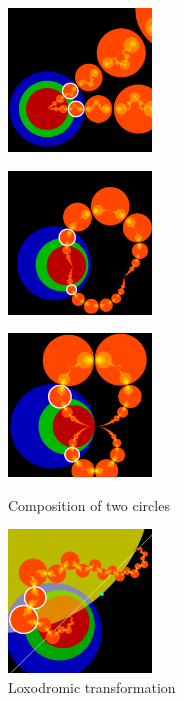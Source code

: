 \begin{figure}[h!tbp]
 \begin{minipage}[]{0.65\hsize}
  \begin{minipage}[]{0.22\hsize}
   \center
   \includegraphics[width=1.5in, height=1.5in, keepaspectratio]{../img/klein/2diis/scalingEdged.pdf}
   \label{fig:scaling2d}
  \end{minipage}
 \hspace*{\fill}
  \begin{minipage}[]{0.22\hsize}
   \center
   \includegraphics[width=1.5in, height=1.5in, keepaspectratio]{../img/klein/2diis/hyperbolicEdged.pdf}
   \label{fig:hyperbolic2d}
  \end{minipage}
 \hspace*{\fill}
  \begin{minipage}[]{0.22\hsize}
   \center
   \includegraphics[width=1.5in, height=1.5in, keepaspectratio]{../img/klein/2diis/parabolicEdged.pdf}
   \label{fig:parabolic2d}
  \end{minipage}
  \caption{Composition of two circles}
 \end{minipage}
 \hspace*{\fill}
 \begin{minipage}[]{0.22\hsize}
  \center
  \includegraphics[width=1.5in, height=1.5in, keepaspectratio]{../img/klein/2diis/loxodromicEdged.pdf}
  \caption{Loxodromic transformation}
  \label{fig:loxodromic2d}
 \end{minipage}
\end{figure}

